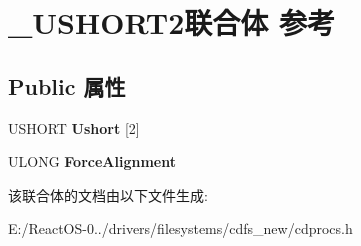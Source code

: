 \hypertarget{union___u_s_h_o_r_t2}{}\section{\+\_\+\+U\+S\+H\+O\+R\+T2联合体 参考}
\label{union___u_s_h_o_r_t2}
\subsection*{Public 属性}
\begin{DoxyCompactItemize}
\item 
\mbox{\label{union___u_s_h_o_r_t2_aad9dcc8045973f9e31c9b41de517596b}} 
U\+S\+H\+O\+RT {\bfseries Ushort} \mbox{[}2\mbox{]}
\item 
\mbox{\label{union___u_s_h_o_r_t2_abceb8d1a3c2d0be59ba2a20947bc19fd}} 
U\+L\+O\+NG {\bfseries Force\+Alignment}
\end{DoxyCompactItemize}


该联合体的文档由以下文件生成\+:\begin{DoxyCompactItemize}
\item 
E\+:/\+React\+O\+S-\/0../drivers/filesystems/cdfs\+\_\+new/cdprocs.\+h\end{DoxyCompactItemize}
